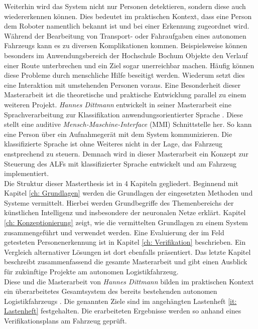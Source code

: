 		Weiterhin wird das System nicht nur Personen detektieren, sondern diese auch wiedererkennen können. Dies bedeutet im praktischen Kontext, dass eine Person dem Roboter namentlich bekannt ist und bei einer Erkennung zugeordnet wird.  \\
		
		Während der Bearbeitung von Transport- oder Fahraufgaben eines autonomen Fahrzeugs kann es zu diversen Komplikationen kommen. Beispielsweise können besonders im Anwendungsbereich der Hochschule Bochum Objekte den Verlauf einer Route unterbrechen und ein Ziel sogar unerreichbar machen. Häufig können diese Probleme durch menschliche Hilfe beseitigt werden. Wiederum setzt dies eine Interaktion mit umstehenden Personen voraus. Eine Besonderheit dieser Masterarbeit ist die theoretische und praktische Entwicklung parallel zu einem weiteren Projekt. \textit{Hannes Dittmann} entwickelt in seiner Masterarbeit eine Sprachverarbeitung zur Klassifikation anwendungsorientierter Sprache \cite{Dittmann}. Diese stellt eine auditive \textit{Mensch-Maschine-Interface} (MMI) Schnittstelle her. So kann eine Person über ein Aufnahmegerät mit dem System kommunizieren. Die klassifizierte Sprache ist ohne Weiteres nicht in der Lage, das Fahrzeug enstprechend zu steuern. Demnach wird in dieser Masterarbeit ein Konzept zur Steuerung des ALFs mit klassifizierter Sprache entwickelt und am Fahrzeug implementiert.\\
		
		Die Struktur dieser Masterthesis ist in 4 Kapiteln gegliedert. Beginnend mit Kapitel \ref{ch: Grundlagen} werden die Grundlagen der eingesetzten Methoden und Systeme vermittelt. Hierbei werden Grundbegriffe des Themenbereichs der künstlichen Intelligenz und insbesondere der neuronalen Netze erklärt. Kapitel \ref{ch: Konzeptionierung} zeigt, wie die vermittelten Grundlagen zu einem System zusammengeführt und verwendet werden. Eine Evaluierung der im Feld getesteten Personenerkennung ist in Kapitel \ref{ch: Verifikation} beschrieben. Ein Vergleich alternativer Lösungen ist dort ebenfalls präsentiert. Das letzte Kapitel beschreibt zusammenfassend die gesamte Masterarbeit und gibt einen Ausblick für zukünftige Projekte am autonomen Logistikfahrzeug. \\
		
		Diese und die Masterarbeit von \textit{Hannes Dittmann} bilden im praktischen Kontext ein überarbeitetes Gesamtsystem des bereits bestehenden autonomen Logistikfahrzeugs \cite{Dittmann}. Die genannten Ziele sind im angehängten Lastenheft \ref{it: Lastenheft} festgehalten. Die erarbeiteten Ergebnisse werden so anhand eines Verifikationsplans am Fahrzeug geprüft.
		
		
		
		
	
